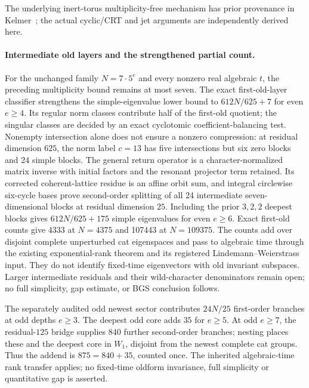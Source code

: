 The underlying inert-torus multiplicity-free mechanism has prior provenance
in Kelmer~\cite{Kelmer2008PrimePowers}; the actual cyclic/CRT and jet arguments
are independently derived here.

\paragraph{Intermediate old layers and the strengthened partial count.}
For the unchanged family $N=7\cdot5^e$ and every nonzero real algebraic
$t$, the preceding multiplicity bound remains at most seven. The exact
first-old-layer classifier strengthens the simple-eigenvalue lower bound to
$612N/625+7$ for even $e\ge4$. Its regular norm classes contribute half of
the first-old quotient; the singular classes are decided by an exact
cyclotomic coefficient-balancing test. Nonempty intersection alone does
not ensure a nonzero compression: at residual dimension $625$, the norm
label $c=13$ has five intersections but six zero blocks and 24 simple blocks.
The general return operator is a character-normalized matrix inverse with
initial factors and the resonant projector term retained. Its corrected
coherent-lattice residue is an affine orbit sum, and integral circlewise
six-cycle bases prove second-order splitting of all 24 intermediate
seven-dimensional blocks at residual dimension $25$. Including the prior
$3,2,2$ deepest blocks gives $612N/625+175$ simple eigenvalues for even
$e\ge6$. Exact first-old counts give 4333 at $N=4375$ and 107443 at
$N=109375$. The counts add over disjoint complete unperturbed cat eigenspaces
and pass to algebraic time through the existing exponential-rank theorem
and its registered Lindemann--Weierstrass input. They do not identify
fixed-time eigenvectors with old invariant subspaces. Larger intermediate
residuals and their wild-character denominators remain open; no full
simplicity, gap estimate, or BGS conclusion follows.

The separately audited odd newest sector contributes $24N/25$ first-order
branches at odd depths $e\ge3$. The deepest odd core adds $35$ for $e\ge5$.
At odd $e\ge7$, the residual-$125$ bridge supplies $840$ further second-order
branches; nesting places these and the deepest core in $W_1$, disjoint from
the newest complete cat groups. Thus the addend is $875=840+35$, counted once.
The inherited algebraic-time rank transfer applies; no fixed-time oldform
invariance, full simplicity or quantitative gap is asserted.
